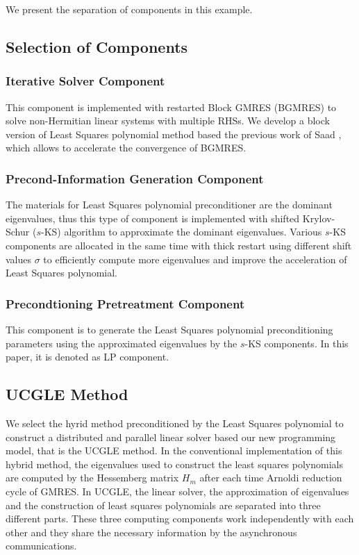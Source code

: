 We present the separation of components in this example.


\subsection{Selection of Components} \label{Divide of Linear Solvers into Components}

\subsubsection{Iterative Solver Component}
 
This component is implemented with restarted Block GMRES (BGMRES) \cite{simoncini1996convergence} to solve non-Hermitian linear systems with multiple RHSs. We develop a block version of Least Squares polynomial method based the previous work of Saad \cite{saad1987least}, which allows to accelerate the convergence of BGMRES.

\subsubsection{Precond-Information Generation Component}

The materials for Least Squares polynomial preconditioner are the dominant eigenvalues, thus this type of component is implemented with shifted Krylov-Schur ($s$-KS) algorithm \cite{stewart2002krylov} to approximate the dominant eigenvalues. Various $s$-KS components are allocated in the same time with thick restart using different shift values $\sigma$ to efficiently compute more eigenvalues and improve the acceleration of Least Squares polynomial.

\subsubsection{Precondtioning Pretreatment Component}

This component is to generate the Least Squares polynomial preconditioning parameters using the approximated eigenvalues by the $s$-KS components. In this paper, it is denoted as LP component.

\subsection{UCGLE Method} \label{UCGLE}

We select the hyrid method preconditioned by the Least Squares polynomial to construct a distributed and parallel linear solver based our new programming model, that is the UCGLE method. In the conventional implementation of this hybrid method, the eigenvalues used to construct the least squares polynomials are computed by the Hessemberg matrix $H_m$ after each time Arnoldi reduction cycle of GMRES. In UCGLE, the linear solver, the approximation of eigenvalues and the construction of least squares polynomials are separated into three different parts. These three computing components work independently with each other and they share the necessary information by the asynchronous communications.

